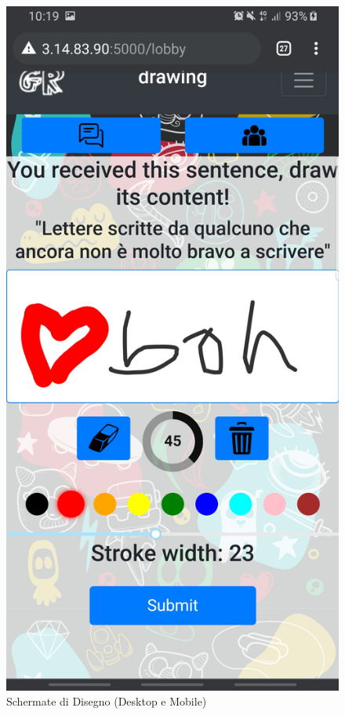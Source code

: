 \begin{figure}[H]
\begin{minipage}[b]{0.2\textwidth}
    \includegraphics[width=\textwidth]{img/screen/M draw.jpg}
  \end{minipage}
    \caption{Schermate di Disegno (Desktop e Mobile)}
\end{figure}


